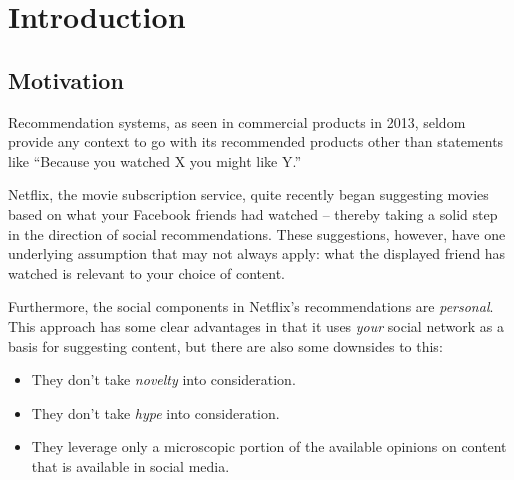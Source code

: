 
\chapter{Introduction} %

\label{Chapter1} %




\section{Motivation}

% 

Recommendation systems, as seen in commercial products in 2013, seldom provide any context to go with its recommended products other than statements like ``Because you watched X you might like Y.''

Netflix, the movie subscription service, quite recently began suggesting movies based on what your Facebook friends had watched -- thereby taking a solid step in the direction of social recommendations.
These suggestions, however, have one underlying assumption that may not always apply:
what the displayed friend has watched is relevant to your choice of content.

Furthermore, the social components in Netflix's recommendations are \emph{personal}.
This approach has some clear advantages in that it uses \emph{your} social network as a basis for suggesting content, but there are also some downsides to this:

\begin{itemize}
  \item They don't take \emph{novelty} into consideration.
  \item They don't take \emph{hype} into consideration.
  \item They leverage only a microscopic portion of the available opinions on content that is available in social media.
\end{itemize}

